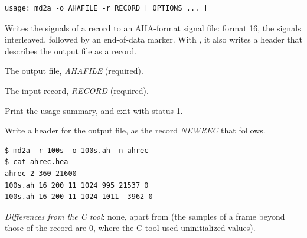 \begin{lstlisting}[style=signature,language={}]
usage: md2a -o AHAFILE -r RECORD [ OPTIONS ... ]
\end{lstlisting}
Writes the signals of a record to an AHA-format signal file: format 16, the signals
interleaved, followed by an end-of-data marker. With , it also writes a header that
describes the output file as a record.
\begin{params}
\item[-o] The output file, \textit{AHAFILE} (required).
\item[-r] The input record, \textit{RECORD} (required).
\item[-h] Print the usage summary, and exit with status 1.
\item[-n] Write a header for the output file, as the record \textit{NEWREC} that follows.
\end{params}
\begin{lstlisting}[style=text]
$ md2a -r 100s -o 100s.ah -n ahrec
$ cat ahrec.hea
ahrec 2 360 21600
100s.ah 16 200 11 1024 995 21537 0
100s.ah 16 200 11 1024 1011 -3962 0
\end{lstlisting}
\textit{Differences from the C tool}: none, apart from  (the samples of a
frame beyond those of the record are 0, where the C tool used uninitialized values).

